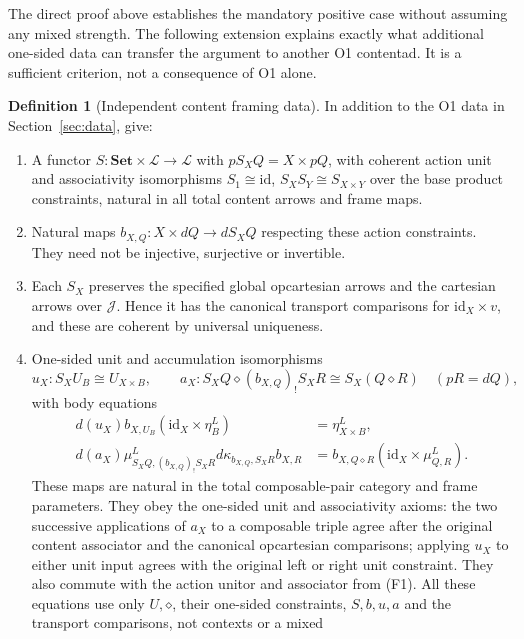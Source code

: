 \documentclass[11pt,a4paper]{article}
\theoremstyle{definition}
\newtheorem{definition}[theorem]{Definition}
\newcommand{\Set}{\mathbf{Set}}
\newcommand{\Lcat}{\mathcal L}
\newcommand{\J}{\mathcal J}
\newcommand{\id}{\mathrm{id}}
\newcommand{\diamondc}{\mathbin{\diamond}}
\begin{document}
The direct proof above establishes the mandatory positive case without
assuming any mixed strength. The following extension explains exactly what
additional one-sided data can transfer the argument to another O1 contentad.
It is a sufficient criterion, not a consequence of O1 alone.

\begin{definition}[Independent content framing data]\label{def:frame-data}
In addition to the O1 data in Section~\ref{sec:data}, give:
\begin{enumerate}[label=\textup{(F\arabic*)}]
\item A functor $S:\Set\times\Lcat\to\Lcat$ with
$pS_XQ=X\times pQ$, with coherent action unit and associativity isomorphisms
$S_1\cong\id$, $S_XS_Y\cong S_{X\times Y}$ over the base product
constraints, natural in all total content arrows and frame maps.
\item Natural maps $b_{X,Q}:X\times dQ\to dS_XQ$ respecting these action
constraints. They need not be injective, surjective or invertible.
\item Each $S_X$ preserves the specified global opcartesian arrows and the
cartesian arrows over $\J$. Hence it has the canonical transport comparisons
for $\id_X\times v$, and these are coherent by universal uniqueness.
\item One-sided unit and accumulation isomorphisms
\[
 u_X:S_XU_B\cong U_{X\times B},\qquad
 a_X:S_XQ\diamondc(b_{X,Q})_!S_XR\cong S_X(Q\diamondc R)
 \quad(pR=dQ),
\]
with body equations
\begin{align}
 d(u_X)b_{X,U_B}(\id_X\times\eta^L_B)&=\eta^L_{X\times B},
                                                        \label{eq:frame-unit}\\
 d(a_X)\mu^L_{S_XQ,(b_{X,Q})_!S_XR}
 d\kappa_{b_{X,Q},S_XR}b_{X,R}
 &=b_{X,Q\diamondc R}(\id_X\times\mu^L_{Q,R}).
                                                        \label{eq:frame-accum}
\end{align}
These maps are natural in the total composable-pair category and frame
parameters. They obey the one-sided unit and associativity axioms: the two
successive applications of $a_X$ to a composable triple agree after the
original content associator and the canonical opcartesian comparisons;
applying $u_X$ to either unit input agrees with the original left or right
unit constraint. They also commute with the action unitor and associator
from (F1). All these equations use only $U,\diamondc$, their one-sided
constraints, $S,b,u,a$ and the transport comparisons, not contexts or a mixed

\end{enumerate}
\end{definition}
\end{document}

